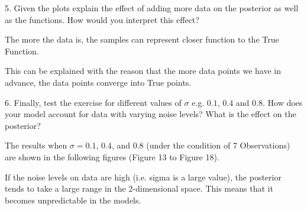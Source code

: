 \documentclass[12pt,letterpaper]{article}
\begin{document}
\clearpage

5. Given the plots explain the effect of adding more data on the posterior as well as the functions. How would you interpret this effect?

The more the data is,
the samples can represent closer function to the True Function.

This can be explained with the reason that
the more data points we have in advance,
the data points converge into True points.


6. Finally, test the exercise for different values of $\sigma$ e.g. $0.1$, $0.4$ and $0.8$. How does your model account for data with varying noise levels? What is the effect on the posterior?

The results when $\sigma = 0.1$, $0.4$, and $0.8$
(under the condition of 7 Observations)
are shown in the following figures (Figure 13 to Figure 18).

If the noise levels on data are high (i.e. sigma is a large value),
the posterior tends to take a large range in the 2-dimensional space.
This means that it becomes unpredictable in the models.
\end{document}
